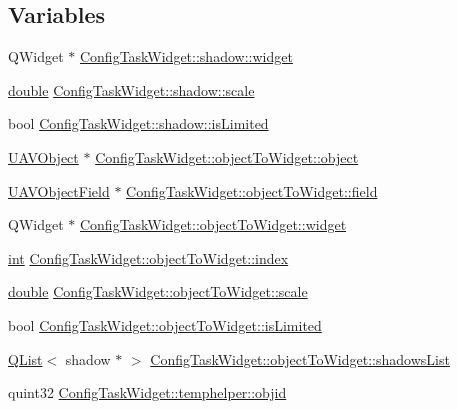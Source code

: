 \subsection*{Variables}
\begin{DoxyCompactItemize}
\item 
Q\-Widget $\ast$ \hyperlink{group___u_a_v_object_widget_utils_ga06fc48ad3875446139f13fbb5b85cdcf}{Config\-Task\-Widget\-::shadow\-::widget}
\item 
\hyperlink{_super_l_u_support_8h_a8956b2b9f49bf918deed98379d159ca7}{double} \hyperlink{group___u_a_v_object_widget_utils_ga06ad87fdaa5af70d7239dda785c76f76}{Config\-Task\-Widget\-::shadow\-::scale}
\item 
bool \hyperlink{group___u_a_v_object_widget_utils_ga712acd84a5850623406835776b1840b4}{Config\-Task\-Widget\-::shadow\-::is\-Limited}
\item 
\hyperlink{class_u_a_v_object}{U\-A\-V\-Object} $\ast$ \hyperlink{group___u_a_v_object_widget_utils_ga0a7a2adb310cdc6b0301dfad762a4f30}{Config\-Task\-Widget\-::object\-To\-Widget\-::object}
\item 
\hyperlink{class_u_a_v_object_field}{U\-A\-V\-Object\-Field} $\ast$ \hyperlink{group___u_a_v_object_widget_utils_ga36fdb22e759e0beae23ae99b03becb68}{Config\-Task\-Widget\-::object\-To\-Widget\-::field}
\item 
Q\-Widget $\ast$ \hyperlink{group___u_a_v_object_widget_utils_gac3c3016bdfda2c16ec8e356dd1a0882d}{Config\-Task\-Widget\-::object\-To\-Widget\-::widget}
\item 
\hyperlink{ioapi_8h_a787fa3cf048117ba7123753c1e74fcd6}{int} \hyperlink{group___u_a_v_object_widget_utils_ga32127d63078e835a69c50d20ea1a678b}{Config\-Task\-Widget\-::object\-To\-Widget\-::index}
\item 
\hyperlink{_super_l_u_support_8h_a8956b2b9f49bf918deed98379d159ca7}{double} \hyperlink{group___u_a_v_object_widget_utils_ga7981e8bb575a90d2a1491fd792108efe}{Config\-Task\-Widget\-::object\-To\-Widget\-::scale}
\item 
bool \hyperlink{group___u_a_v_object_widget_utils_ga22163ec4275b9b06770d4caead750ee4}{Config\-Task\-Widget\-::object\-To\-Widget\-::is\-Limited}
\item 
\hyperlink{class_q_list}{Q\-List}$<$ shadow $\ast$ $>$ \hyperlink{group___u_a_v_object_widget_utils_ga720684f6824db0612bacf1e3769c4ef3}{Config\-Task\-Widget\-::object\-To\-Widget\-::shadows\-List}
\item 
quint32 \hyperlink{group___u_a_v_object_widget_utils_ga4c750b1bce138cf6e002f73fca580c4d}{Config\-Task\-Widget\-::temphelper\-::objid}

\end{DoxyCompactItemize}
